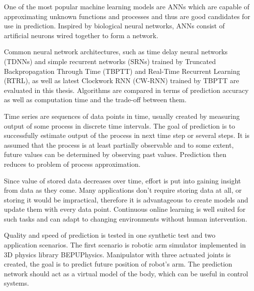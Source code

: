 \documentclass[12pt,oneside]{fithesis2}
\begin{document}
\par %
One of the most popular machine learning models are ANNs which are capable of approximating unknown functions and processes and thus are good candidates for use in prediction. Inspired by biological neural networks, ANNs consist of artificial neurons wired together to form a network.
\par %
Common neural network architectures, such as time delay neural networks (TDNNs) and simple recurrent networks (SRNs) trained by Truncated Backpropagation Through Time (TBPTT) and Real-Time Recurrent Learning (RTRL), as well as latest Clockwork RNN (CW-RNN) trained by TBPTT are evaluated in this thesis. Algorithms are compared in terms of prediction accuracy as well as computation time and the trade-off between them.
\par %
Time series are sequences of data points in time, usually created by measuring output of some process in discrete time intervals. The goal of prediction is to successfully estimate output of the process in next time step or several steps. It is assumed that the process is at least partially observable and to some extent, future values can be determined by observing past values. Prediction then reduces to problem of process approximation.
\par %
Since value of stored data decreases over time, effort is put into gaining insight from data as they come. Many applications don't require storing data at all, or storing it would be impractical, therefore it is advantageous to create models and update them with every data point. Continuous online learning is well suited for such tasks and can adapt to changing environments without human intervention.
\par %
Quality and speed of prediction is tested in one synthetic test and two application scenarios. The first scenario is robotic arm simulator implemented in 3D physics library BEPUPhysics. Manipulator with three actuated joints is created, the goal is to predict future position of robot's arm. The prediction network should act as a virtual model of the body, which can be useful in control systems.

\end{document}
